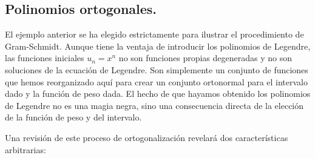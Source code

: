 \subsection{Polinomios ortogonales.}
El ejemplo anterior se ha elegido estrictamente para ilustrar el procedimiento de Gram-Schmidt. Aunque tiene la ventaja de introducir los polinomios de Legendre, las funciones iniciales $u_{n} = x^{n}$ no son funciones propias degeneradas y no son soluciones de la ecuación de Legendre. Son simplemente un conjunto de funciones que hemos reorganizado aquí para crear un conjunto ortonormal para el intervalo dado y la función de peso dada. El hecho de que hayamos obtenido los polinomios de Legendre no es una magia negra, sino una consecuencia directa de la elección de la función de peso y del intervalo.
\par
\begin{table}[H]
\caption{Polinomios ortogonales generados por la ortogonalización de Gram-Schmidt de $u_{n}(x)= x^{n}$, con $n=0,1,2,\ldots$}
\end{table}
Una revisión de este proceso de ortogonalización revelará dos características arbitrarias:
